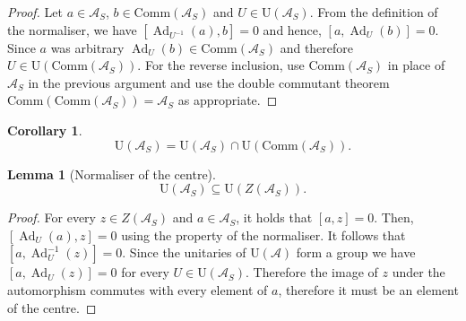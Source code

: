 \documentclass[11pt, twocolumn, floatfix, superscriptaddress, aps, prb, raggedbottom]{revtex4-2}
\newtheorem{lemma}[theorem]{Lemma}
\newtheorem{corollary}[theorem]{Corollary}
\newcommand{\comm}{\mathrm{Comm}}
\DeclareMathOperator{\Ad}{Ad}
\begin{document}
\begin{proof}
    Let $a \in \mathcal{A}_S$, $b \in \comm (\mathcal{A}_S)$ and $U \in \mathrm{U}(\mathcal{A}_S)$.
    From the definition of the normaliser, we have $[\Ad_{U^{-1}}(a),b] = 0$ and hence, $[a, \Ad_{U}(b)] = 0$.
    Since $a$ was arbitrary $\Ad_{U}(b) \in \comm(\mathcal{A}_S)$ and therefore $U \in \mathrm{U}(\comm(\mathcal{A}_S))$.
    For the reverse inclusion, use $\comm(\mathcal{A}_S)$ in place of $\mathcal{A}_S$ in the previous argument and use the double commutant theorem $\comm(\comm(\mathcal{A}_S)) = \mathcal{A}_S$ as appropriate.
\end{proof}
\begin{corollary}
    \begin{equation}\mathrm{U}(\mathcal{A}_S) = \mathrm{U}(\mathcal{A}_S) \cap  \mathrm{U}(\comm(\mathcal{A}_S)).
    \end{equation}
\end{corollary}
\begin{lemma}[Normaliser of the centre]
    \begin{equation}\mathrm{U}(\mathcal{A}_S) \subseteq \mathrm{U}(Z(\mathcal{A}_S)).\end{equation}
    \label{lemma:comm_normaliser}
\end{lemma}
\begin{proof}
    For every $z \in Z(\mathcal{A}_S)$ and $a \in \mathcal{A}_S$, it holds that $[a,z] =0$. Then, $[\Ad_U(a), z] = 0$ using the property of the normaliser. It follows that $[a, \Ad_U^{-1}(z)] = 0$. Since the unitaries of $\mathrm{U}(\mathcal{A})$ form a group we have $[a, \Ad_U(z)] = 0$ for every $U \in \mathrm{U}(\mathcal{A}_S)$. Therefore the image of $z$ under the automorphism commutes with every element of $a$, therefore it must be an element of the centre.
\end{proof}
\end{document}
